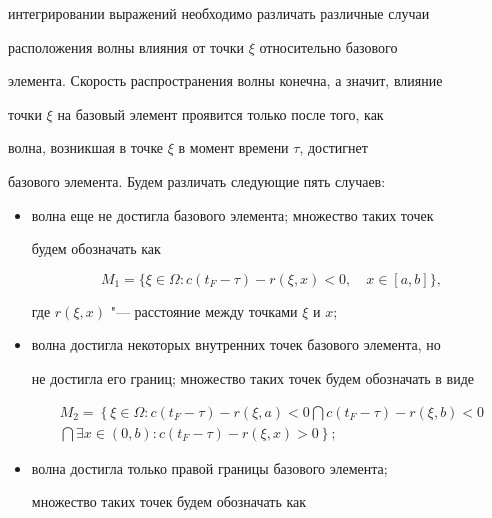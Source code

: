 интегрировании выражений необходимо различать различные случаи

расположения волны влияния от точки $\xi$ относительно базового

элемента. Скорость распространения волны конечна, а значит, влияние

точки $\xi$ на базовый элемент проявится только после того, как

волна, возникшая в точке $\xi$ в момент времени $\tau$, достигнет

базового элемента. Будем различать следующие пять случаев:

\begin{itemize}

\item[1)]

волна еще не достигла базового элемента; множество таких точек

будем обозначать как

\[

M_1 = \{\xi \in \Omega :c(t_F -\tau )-r(\xi ,x)<0, \quad x\in

[a,b] \},

\]

где $r(\xi ,x)$ "--- расстояние между точками $\xi $ и $x$;



\item[2)]

волна достигла некоторых внутренних точек базового элемента, но

не достигла его границ; множество таких точек будем обозначать в виде

\begin{multline*}

M_2 =\left\{\xi \in \Omega :c(t_{F} -\tau )-r(\xi ,a)<0 \bigcap

c(t_F -\tau )-r(\xi ,b)<0 \right.\\

\left. \bigcap \exists x\in (0,b): c(t_F -\tau )-r(\xi ,x)>0

\right\};

\end{multline*}



\item[3)]

волна достигла только правой границы базового элемента;

множество таких точек будем обозначать как

$$


\end{itemize}
